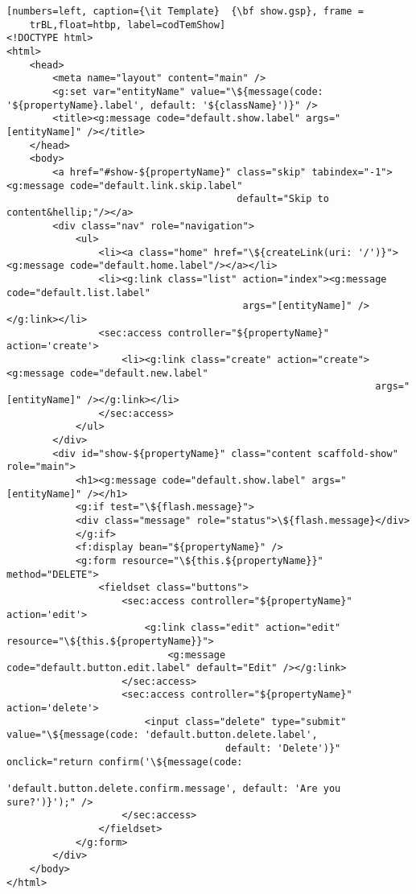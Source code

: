 \begin{lstlisting}[numbers=left, caption={\it Template}  {\bf show.gsp}, frame =
    trBL,float=htbp, label=codTemShow] 
<!DOCTYPE html>
<html>
    <head>
        <meta name="layout" content="main" />
        <g:set var="entityName" value="\${message(code: '${propertyName}.label', default: '${className}')}" />
        <title><g:message code="default.show.label" args="[entityName]" /></title>
    </head>
    <body>
        <a href="#show-${propertyName}" class="skip" tabindex="-1"><g:message code="default.link.skip.label" 
                                        default="Skip to content&hellip;"/></a>
        <div class="nav" role="navigation">
            <ul>
                <li><a class="home" href="\${createLink(uri: '/')}"><g:message code="default.home.label"/></a></li>
                <li><g:link class="list" action="index"><g:message code="default.list.label" 
                                         args="[entityName]" /></g:link></li>
                <sec:access controller="${propertyName}" action='create'>
                    <li><g:link class="create" action="create"><g:message code="default.new.label" 
                                                                args="[entityName]" /></g:link></li>
                </sec:access>
            </ul>
        </div>
        <div id="show-${propertyName}" class="content scaffold-show" role="main">
            <h1><g:message code="default.show.label" args="[entityName]" /></h1>
            <g:if test="\${flash.message}">
            <div class="message" role="status">\${flash.message}</div>
            </g:if>
            <f:display bean="${propertyName}" />
            <g:form resource="\${this.${propertyName}}" method="DELETE">
                <fieldset class="buttons">
                    <sec:access controller="${propertyName}" action='edit'>
                        <g:link class="edit" action="edit" resource="\${this.${propertyName}}">
                            <g:message code="default.button.edit.label" default="Edit" /></g:link>
                    </sec:access>
                    <sec:access controller="${propertyName}" action='delete'>
                        <input class="delete" type="submit" value="\${message(code: 'default.button.delete.label', 
                                      default: 'Delete')}" onclick="return confirm('\${message(code: 
                                      'default.button.delete.confirm.message', default: 'Are you sure?')}');" />
                    </sec:access>
                </fieldset>
            </g:form>
        </div>
    </body>
</html>
\end{lstlisting}

